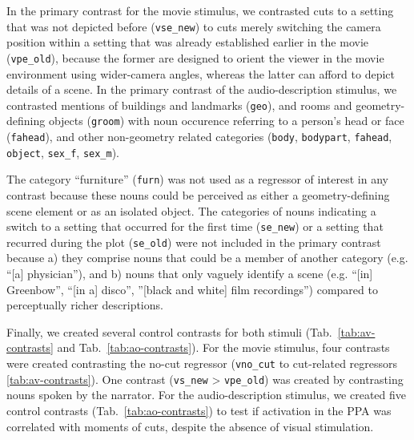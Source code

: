 \documentclass[english]{article}
\begin{document}
In the primary contrast for the movie stimulus, we contrasted cuts to a setting
that was not depicted before (\texttt{vse\_new}) to cuts merely switching the
camera position within a setting that was already established earlier in the
movie (\texttt{vpe\_old}), because the former are designed to orient the viewer
in the movie environment using wider-camera angles, whereas the latter can
afford to depict details of a scene.
In the primary contrast of the audio-description stimulus, we contrasted
mentions of buildings and landmarks (\texttt{geo}), and rooms and
geometry-defining objects (\texttt{groom}) with noun occurence referring to a
person's head or face (\texttt{fahead}), and other non-geometry related
categories (\texttt{body}, \texttt{bodypart}, \texttt{fahead}, \texttt{object},
\texttt{sex\_f}, \texttt{sex\_m}).

The category ``furniture'' (\texttt{furn}) was not used as a regressor of
interest in any contrast because these nouns could be perceived as either a
geometry-defining scene element or as an isolated object.
The categories of nouns indicating a switch to a setting that occurred for the
first time (\texttt{se\_new}) or a setting that recurred during the plot
(\texttt{se\_old}) were not included in the primary contrast because
a) they comprise nouns that could be a member of another category (e.g. ``[a]
physician''), and
b) nouns that only vaguely identify a scene (e.g. ``[in] Greenbow'', ``[in a]
disco'', ''[black and white] film recordings'') compared to perceptually richer
descriptions.

Finally, we created several control contrasts for both stimuli
(Tab.~\ref{tab:av-contrasts} and Tab.~\ref{tab:ao-contrasts}).
For the movie stimulus, four contrasts were created contrasting the no-cut
regressor (\texttt{vno\_cut} to cut-related regressors \ref{tab:av-contrasts}).
One contrast (\texttt{vs\_new} > \texttt{vpe\_old}) was created by contrasting
nouns spoken by the narrator.
For the audio-description stimulus, we created five control contrasts
(Tab.~\ref{tab:ao-contrasts}) to test if activation in the PPA was
correlated with moments of cuts, despite the absence of visual stimulation.
\end{document}

